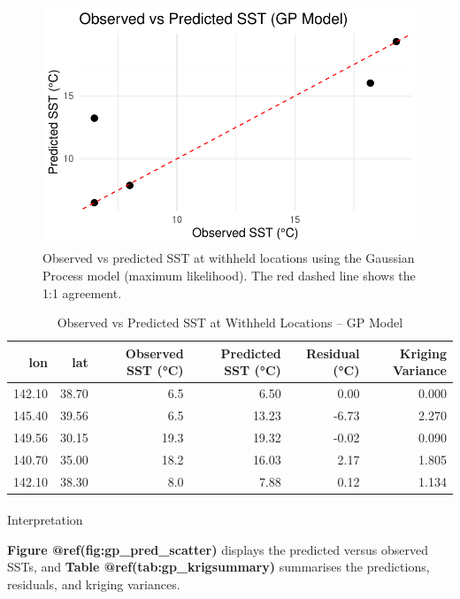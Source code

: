 \documentclass[
  11pt,
]{article}
\makeatletter
\let\oldparagraph\paragraph
\renewcommand{\paragraph}{
    \@ifstar
      \xxxParagraphStar
      \xxxParagraphNoStar
  }
\newcommand{\xxxParagraphStar}[1]{\oldparagraph*{#1}\mbox{}}
\newcommand{\xxxParagraphNoStar}[1]{\oldparagraph{#1}\mbox{}}
\makeatother
\begin{document}
\begin{figure}[H]

{\centering \includegraphics{project_files/figure-pdf/fig-gp_pred_scatter-1.pdf}

}

\caption{Observed vs predicted SST at withheld locations using the
Gaussian Process model (maximum likelihood). The red dashed line shows
the 1:1 agreement.}

\end{figure}%

\begin{table}

\caption{Observed vs Predicted SST at Withheld Locations -- GP Model}
\centering
\begin{tabular}[t]{rrrrrr}
\toprule
lon & lat & Observed SST (°C) & Predicted SST (°C) & Residual (°C) & Kriging Variance\\
\midrule
142.10 & 38.70 & 6.5 & 6.50 & 0.00 & 0.000\\
145.40 & 39.56 & 6.5 & 13.23 & -6.73 & 2.270\\
149.56 & 30.15 & 19.3 & 19.32 & -0.02 & 0.090\\
140.70 & 35.00 & 18.2 & 16.03 & 2.17 & 1.805\\
142.10 & 38.30 & 8.0 & 7.88 & 0.12 & 1.134\\
\bottomrule
\end{tabular}
\end{table}

\paragraph{Interpretation}\label{interpretation}

\textbf{Figure @ref(fig:gp\_pred\_scatter)} displays the predicted
versus observed SSTs, and \textbf{Table @ref(tab:gp\_krigsummary)}
summarises the predictions, residuals, and kriging variances.
\end{document}
